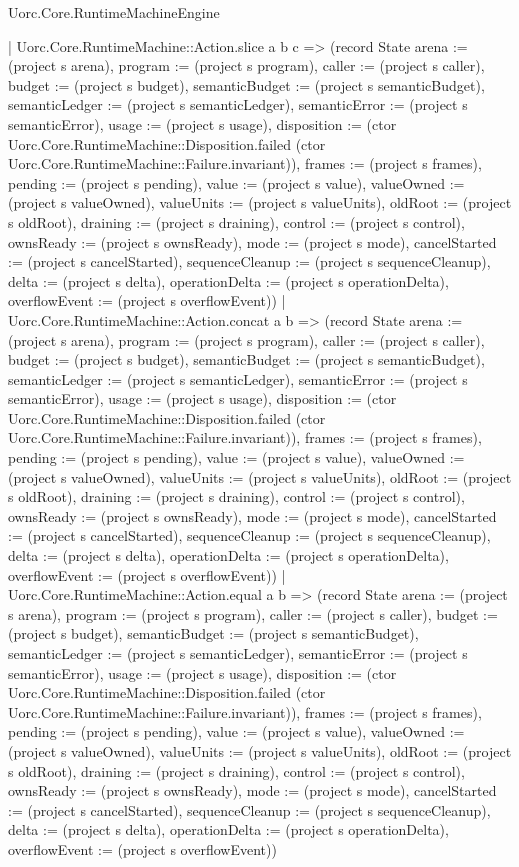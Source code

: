 \begin{lexlean}{Uorc.Core.RuntimeMachineEngine}
\begin{semanticmodule}
{      | Uorc.Core.RuntimeMachine::Action.slice a b c => (record State {arena := (project s arena), program := (project s program), caller := (project s caller), budget := (project s budget), semanticBudget := (project s semanticBudget), semanticLedger := (project s semanticLedger), semanticError := (project s semanticError), usage := (project s usage), disposition := (ctor Uorc.Core.RuntimeMachine::Disposition.failed (ctor Uorc.Core.RuntimeMachine::Failure.invariant)), frames := (project s frames), pending := (project s pending), value := (project s value), valueOwned := (project s valueOwned), valueUnits := (project s valueUnits), oldRoot := (project s oldRoot), draining := (project s draining), control := (project s control), ownsReady := (project s ownsReady), mode := (project s mode), cancelStarted := (project s cancelStarted), sequenceCleanup := (project s sequenceCleanup), delta := (project s delta), operationDelta := (project s operationDelta), overflowEvent := (project s overflowEvent)})
      | Uorc.Core.RuntimeMachine::Action.concat a b => (record State {arena := (project s arena), program := (project s program), caller := (project s caller), budget := (project s budget), semanticBudget := (project s semanticBudget), semanticLedger := (project s semanticLedger), semanticError := (project s semanticError), usage := (project s usage), disposition := (ctor Uorc.Core.RuntimeMachine::Disposition.failed (ctor Uorc.Core.RuntimeMachine::Failure.invariant)), frames := (project s frames), pending := (project s pending), value := (project s value), valueOwned := (project s valueOwned), valueUnits := (project s valueUnits), oldRoot := (project s oldRoot), draining := (project s draining), control := (project s control), ownsReady := (project s ownsReady), mode := (project s mode), cancelStarted := (project s cancelStarted), sequenceCleanup := (project s sequenceCleanup), delta := (project s delta), operationDelta := (project s operationDelta), overflowEvent := (project s overflowEvent)})
      | Uorc.Core.RuntimeMachine::Action.equal a b => (record State {arena := (project s arena), program := (project s program), caller := (project s caller), budget := (project s budget), semanticBudget := (project s semanticBudget), semanticLedger := (project s semanticLedger), semanticError := (project s semanticError), usage := (project s usage), disposition := (ctor Uorc.Core.RuntimeMachine::Disposition.failed (ctor Uorc.Core.RuntimeMachine::Failure.invariant)), frames := (project s frames), pending := (project s pending), value := (project s value), valueOwned := (project s valueOwned), valueUnits := (project s valueUnits), oldRoot := (project s oldRoot), draining := (project s draining), control := (project s control), ownsReady := (project s ownsReady), mode := (project s mode), cancelStarted := (project s cancelStarted), sequenceCleanup := (project s sequenceCleanup), delta := (project s delta), operationDelta := (project s operationDelta), overflowEvent := (project s overflowEvent)})
}
\end{semanticmodule}
\end{lexlean}
